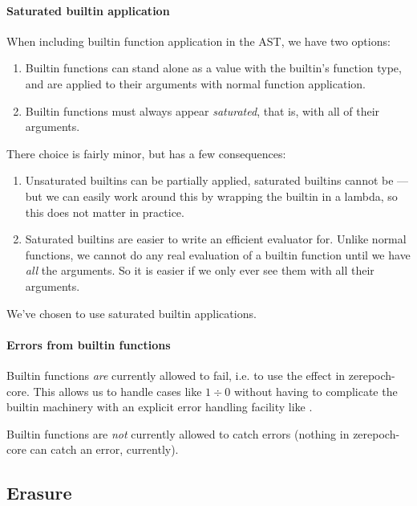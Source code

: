 \paragraph{Saturated builtin application}

When including builtin function application in the AST, we have two options:
\begin{enumerate}
\item
  Builtin functions can stand alone as a value with the builtin's function type, and are applied to their arguments with normal function application.
\item
  Builtin functions must always appear \emph{saturated}, that is, with all of their arguments.
\end{enumerate}

There choice is fairly minor, but has a few consequences:
\begin{enumerate}
\item
  Unsaturated builtins can be partially applied, saturated builtins cannot be --- but we can easily work around this by wrapping the builtin in a lambda, so this does not matter in practice.
\item
  Saturated builtins are easier to write an efficient evaluator for.
  Unlike normal functions, we cannot do any real evaluation of a builtin function until we have \emph{all} the arguments.
  So it is easier if we only ever see them with all their arguments.
\end{enumerate}

We've chosen to use saturated builtin applications.

\paragraph{Errors from builtin functions}

Builtin functions \emph{are} currently allowed to fail, i.e. to use the  effect in \gls{zerepoch-core}.
This allows us to handle cases like $1 \div 0$ without having to complicate the builtin machinery with an explicit error handling facility like .

Builtin functions are \emph{not} currently allowed to catch errors (nothing in \gls{zerepoch-core} can catch an error, currently).

\subsection{Erasure}
\label{sec:erasure}

